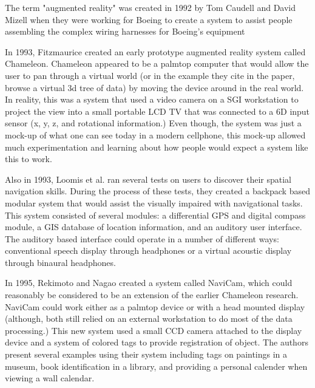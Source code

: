 \documentclass{acm_proc_article-sp}
\begin{document}
The term "augmented reality" was created in 1992 by Tom Caudell and David Mizell when they were working for Boeing to create a system to assist people assembling the complex wiring harnesses for Boeing's equipment \cite{citeulike:6081386} \cite{carmigniani2011augmented}

In 1993, Fitzmaurice created an early prototype augmented reality system called Chameleon.  Chameleon appeared to be a palmtop computer that would allow the user to pan through a virtual world (or in the example they cite in the paper, browse a virtual 3d tree of data) by moving the device around in the real world.  In reality, this was a system that used a video camera on a SGI workstation to project the view into a small portable LCD TV that was connected to a 6D input sensor (x, y, z, and rotational information.)  Even though, the system was just a mock-up of what one can see today in a modern cellphone, this mock-up allowed much experimentation and learning about how people would expect a system like this to work.\cite{fitzmaurice1993situated}

Also in 1993, Loomis et al. ran several tests on users to discover their spatial navigation skills.  \cite{loomis1993nonvisual} During the process of these tests, they created a backpack based modular system that would assist the visually impaired with navigational tasks.  This system consisted of several modules: a differential GPS and digital compass module, a GIS database of location information, and an auditory user interface.  The auditory based interface could operate in a number of different ways: conventional speech display through headphones or a virtual acoustic display through binaural headphones. \cite{loomis1994personal}

In 1995, Rekimoto and Nagao created a system called NaviCam, which could reasonably be considered to be an extension of the earlier Chameleon research. \cite{fitzmaurice1993situated}  NaviCam could work either as a palmtop device or with a head mounted display (although, both still relied on an external workstation to do most of the data processing.)  This new system used a small CCD camera attached to the display device and a system of colored tags to provide registration of object.  The authors present several examples using their system including tags on paintings in a museum, book identification in a library, and providing a personal calender when viewing a wall calendar. \cite{rekimoto1995world}
\end{document}
